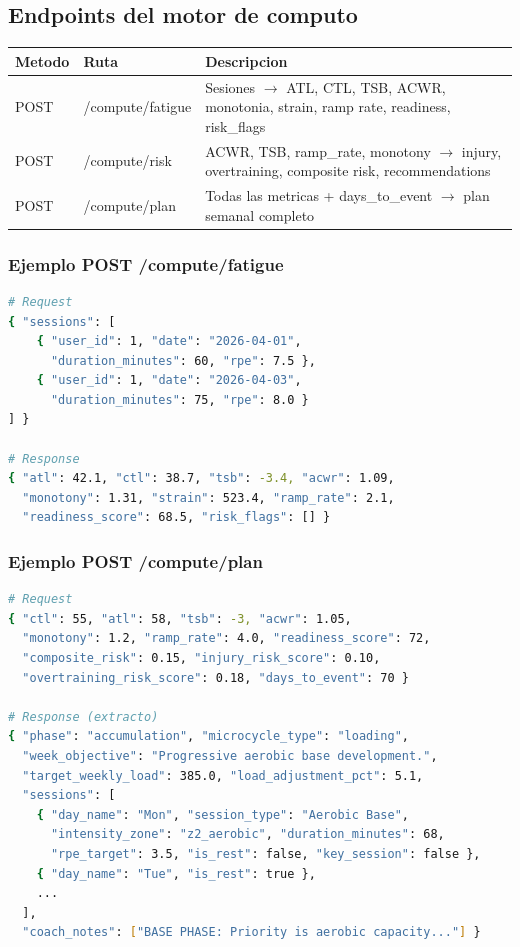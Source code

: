 \documentclass[12pt, a4paper]{article}
\begin{document}
\subsection{Endpoints del motor de computo}

\begin{longtable}{>{\ttfamily}p{1.5cm} >{\ttfamily}p{5cm} p{7.5cm}}
  \toprule
  Metodo & Ruta & Descripcion \\
  \midrule
  \endhead
  POST & /compute/fatigue & Sesiones $\to$ ATL, CTL, TSB, ACWR, monotonia, strain, ramp rate, readiness, risk\_flags \\
  POST & /compute/risk    & ACWR, TSB, ramp\_rate, monotony $\to$ injury, overtraining, composite risk, recommendations \\
  POST & /compute/plan    & Todas las metricas + days\_to\_event $\to$ plan semanal completo \\
  \bottomrule
\end{longtable}

\subsubsection{Ejemplo POST /compute/fatigue}

\begin{lstlisting}[language=bash]
# Request
{ "sessions": [
    { "user_id": 1, "date": "2026-04-01",
      "duration_minutes": 60, "rpe": 7.5 },
    { "user_id": 1, "date": "2026-04-03",
      "duration_minutes": 75, "rpe": 8.0 }
] }

# Response
{ "atl": 42.1, "ctl": 38.7, "tsb": -3.4, "acwr": 1.09,
  "monotony": 1.31, "strain": 523.4, "ramp_rate": 2.1,
  "readiness_score": 68.5, "risk_flags": [] }
\end{lstlisting}

\subsubsection{Ejemplo POST /compute/plan}

\begin{lstlisting}[language=bash]
# Request
{ "ctl": 55, "atl": 58, "tsb": -3, "acwr": 1.05,
  "monotony": 1.2, "ramp_rate": 4.0, "readiness_score": 72,
  "composite_risk": 0.15, "injury_risk_score": 0.10,
  "overtraining_risk_score": 0.18, "days_to_event": 70 }

# Response (extracto)
{ "phase": "accumulation", "microcycle_type": "loading",
  "week_objective": "Progressive aerobic base development.",
  "target_weekly_load": 385.0, "load_adjustment_pct": 5.1,
  "sessions": [
    { "day_name": "Mon", "session_type": "Aerobic Base",
      "intensity_zone": "z2_aerobic", "duration_minutes": 68,
      "rpe_target": 3.5, "is_rest": false, "key_session": false },
    { "day_name": "Tue", "is_rest": true },
    ...
  ],
  "coach_notes": ["BASE PHASE: Priority is aerobic capacity..."] }
\end{lstlisting}
\end{document}
